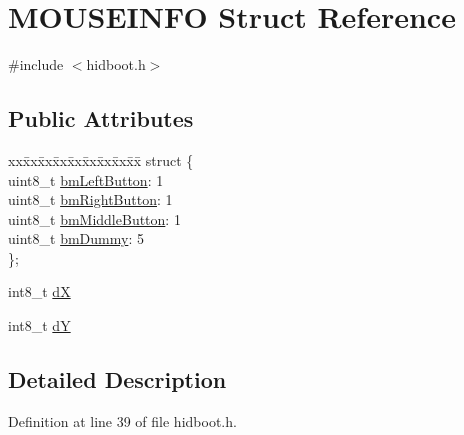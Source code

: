 \hypertarget{struct_m_o_u_s_e_i_n_f_o}{\section{\-M\-O\-U\-S\-E\-I\-N\-F\-O \-Struct \-Reference}
\label{struct_m_o_u_s_e_i_n_f_o}
}


{\ttfamily \#include $<$hidboot.\-h$>$}

\subsection*{\-Public \-Attributes}
\begin{DoxyCompactItemize}
\item 
\begin{tabbing}
xx\=xx\=xx\=xx\=xx\=xx\=xx\=xx\=xx\=\kill
struct \{\\
\>uint8\_t \hyperlink{struct_m_o_u_s_e_i_n_f_o_a848ceb3b38f0dc9e09a83612c1fa89ff}{bmLeftButton}: 1\\
\>uint8\_t \hyperlink{struct_m_o_u_s_e_i_n_f_o_a07f604e1dffc0a72fa28e94a5094ebbe}{bmRightButton}: 1\\
\>uint8\_t \hyperlink{struct_m_o_u_s_e_i_n_f_o_a7fb48a7cb68cfc8db2bb8838694c0b51}{bmMiddleButton}: 1\\
\>uint8\_t \hyperlink{struct_m_o_u_s_e_i_n_f_o_a5ebb72d23926ca7891c2c4606be31ac3}{bmDummy}: 5\\
\}; \\

\end{tabbing}\item 
int8\-\_\-t \hyperlink{struct_m_o_u_s_e_i_n_f_o_a8b67db1c54e5db9782a0b5b707dcf9db}{d\-X}
\item 
int8\-\_\-t \hyperlink{struct_m_o_u_s_e_i_n_f_o_ae7192500776548f5c6868cc37eaaabb2}{d\-Y}
\end{DoxyCompactItemize}


\subsection{\-Detailed \-Description}


\-Definition at line 39 of file hidboot.\-h.



